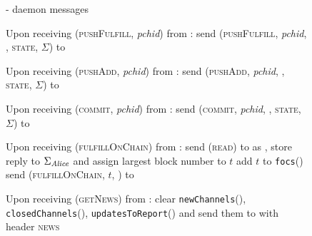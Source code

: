   \begin{figure}[H]
    \begin{systembox}{\fpaynet - daemon messages}
      \begin{algorithmic}[1]
        \State Upon receiving (\textsc{pushFulfill}, \textit{pchid}) from
        \alice:
        \Indent
          \State send (\textsc{pushFulfill}, \textit{pchid}, \alice,
          \textsc{state}, $\Sigma$) to \simulator
          \label{alg:fpaynet:daemon:fulfill}
        \EndIndent
        \Statex

        \State Upon receiving (\textsc{pushAdd}, \textit{pchid}) from \alice:
        \Indent
          \State send (\textsc{pushAdd}, \textit{pchid}, \alice, \textsc{state},
          $\Sigma$) to \simulator
          \label{alg:fpaynet:daemon:add}
        \EndIndent
        \Statex

        \State Upon receiving (\textsc{commit}, \textit{pchid}) from \alice:
        \Indent
          \State send (\textsc{commit}, \textit{pchid}, \alice, \textsc{state},
          $\Sigma$) to \simulator
          \label{alg:fpaynet:daemon:commit}
        \EndIndent
        \Statex

        \State Upon receiving (\textsc{fulfillOnChain}) from \alice:
        \Indent
          \State send (\textsc{read}) to \ledger{} as \alice{}, store reply to
          $\Sigma_{\mathit{Alice}}$ and assign largest block number to $t$
          \label{alg:fpaynet:daemon:foc:read}
          \State add $t$ to \texttt{focs}(\alice)
          \State send (\textsc{fulfillOnChain}, $t$, \alice) to \simulator
        \EndIndent
        \Statex

        \State Upon receiving (\textsc{getNews}) from \alice:
        \Indent
          \State clear \texttt{newChannels}(\alice),
          \texttt{closedChannels}(\alice), \texttt{updatesToReport}(\alice) and
          send them to \alice{} with header \textsc{news}
        \EndIndent
      \end{algorithmic}
    \end{systembox}
    \caption{}
    \label{alg:fpaynet:daemon}
  \end{figure}
